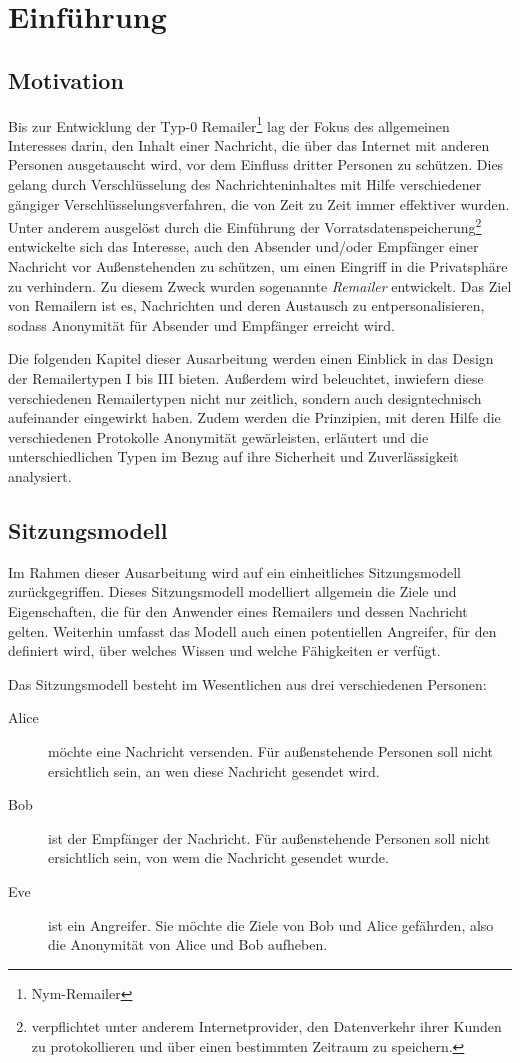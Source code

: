 \chapter{Einführung}

\section{Motivation}
Bis zur Entwicklung der Typ-0 Remailer\footnote{Nym-Remailer} lag der Fokus des allgemeinen Interesses darin, den Inhalt einer Nachricht, die über das Internet mit anderen Personen ausgetauscht wird, vor dem Einfluss dritter Personen zu schützen. Dies gelang durch Verschlüsselung des Nachrichteninhaltes mit Hilfe verschiedener gängiger Verschlüsselungsverfahren, die von Zeit zu Zeit immer effektiver wurden. Unter anderem ausgelöst durch die Einführung der Vorratsdatenspeicherung\footnote{verpflichtet unter anderem Internetprovider, den Datenverkehr ihrer Kunden zu protokollieren und über einen bestimmten Zeitraum zu speichern.} entwickelte sich das Interesse, auch den Absender und/oder Empfänger einer Nachricht vor Außenstehenden zu schützen, um einen Eingriff in die Privatsphäre zu verhindern. Zu diesem Zweck wurden sogenannte \emph{Remailer} entwickelt. Das Ziel von Remailern ist es, Nachrichten und deren Austausch zu entpersonalisieren, sodass Anonymität für Absender und Empfänger erreicht wird.

Die folgenden Kapitel dieser Ausarbeitung werden einen Einblick in das Design der Remailertypen I bis III bieten. Außerdem wird beleuchtet, inwiefern diese verschiedenen Remailertypen nicht nur zeitlich, sondern auch designtechnisch aufeinander eingewirkt haben. Zudem werden die Prinzipien, mit deren Hilfe die verschiedenen Protokolle Anonymität gewärleisten, erläutert und die unterschiedlichen Typen im Bezug auf ihre Sicherheit und Zuverlässigkeit analysiert.

\section{Sitzungsmodell}
Im Rahmen dieser Ausarbeitung wird auf ein einheitliches Sitzungsmodell zurückgegriffen. Dieses Sitzungsmodell modelliert allgemein die Ziele und Eigenschaften, die für den Anwender eines Remailers und dessen Nachricht gelten. Weiterhin umfasst das Modell auch einen potentiellen Angreifer, für den definiert wird, über welches Wissen und welche Fähigkeiten er verfügt. 

Das Sitzungsmodell besteht im Wesentlichen aus drei verschiedenen Personen:
\begin{description}
	\item[Alice] möchte eine Nachricht versenden. Für außenstehende Personen soll nicht ersichtlich sein, an wen diese Nachricht gesendet wird.
	\item[Bob] ist der Empfänger der Nachricht. Für außenstehende Personen soll nicht ersichtlich sein, von wem die Nachricht gesendet wurde. 
	\item[Eve] ist ein Angreifer. Sie möchte die Ziele von Bob und Alice gefährden, also die Anonymität von Alice und Bob aufheben.
\end{description}

